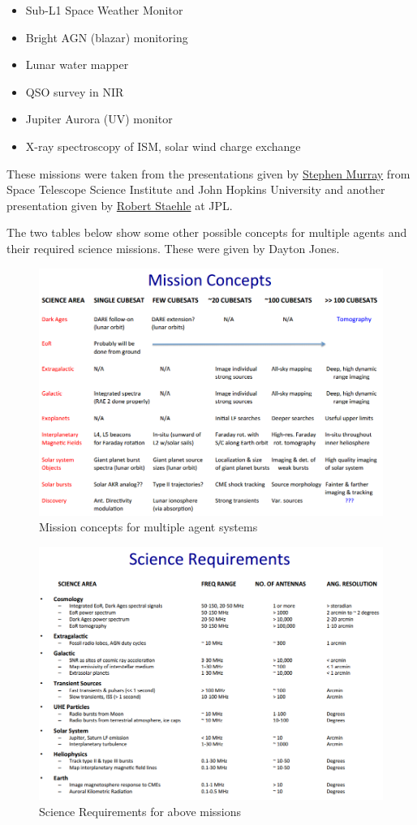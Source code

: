 \begin{itemize}
\item Sub-L1 Space Weather Monitor 
\item Bright AGN (blazar) monitoring
\item Lunar water mapper
\item QSO survey in NIR
\item Jupiter Aurora (UV) monitor
\item X-ray spectroscopy of ISM, solar wind charge exchange
\end{itemize}

These missions were taken from the presentations given by \href{http://kiss.caltech.edu/workshops/smallsat2012/presentations/murray.pdf}{Stephen Murray} from Space Telescope Science Institute and John Hopkins University and another presentation given by \href{http://kiss.caltech.edu/cosponsored/cubesat2012/presentations/staehle-interplanetary-cubesat-missions.pdf}{Robert Staehle} at JPL. 

The two tables below show some other possible concepts for multiple agents and their required science missions. These were given by Dayton Jones. 


\begin{figure}[!ht]
\includegraphics[scale=0.7]{mission_concepts.png}
\caption{Mission concepts for multiple agent systems}
\end{figure}

\begin{figure}[!ht]
\includegraphics[scale=0.7]{science_req.png}
\caption{Science Requirements for above missions}
\end{figure}

\newpage

%
%


%